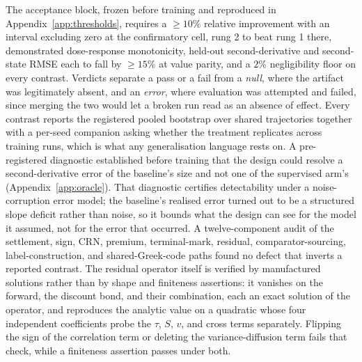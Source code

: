 \documentclass{article}
\begin{document}
The acceptance block, frozen before training and reproduced in
Appendix~\ref{app:thresholds}, requires a $\geq 10\%$ relative improvement with an
interval excluding zero at the confirmatory cell, rung 2 to beat rung 1 there,
demonstrated dose-response monotonicity, held-out second-derivative and second-state
RMSE each to fall by $\geq 15\%$ at value parity, and a $2\%$ negligibility floor on
every contrast. Verdicts separate a pass or a fail from a \emph{null}, where the artifact was
legitimately absent, and an \emph{error}, where evaluation was attempted and failed,
since merging the two would let a broken run read as an absence of effect. Every
contrast reports the registered pooled bootstrap over shared trajectories together
with a per-seed companion asking whether the treatment replicates across training
runs, which is what any generalisation language rests on. A pre-registered diagnostic established before training that the design could
resolve a second-derivative error of the baseline's size and not one of the
supervised arm's (Appendix~\ref{app:oracle}). That diagnostic certifies detectability
under a noise-corruption error model; the baseline's realised error turned out to be
a structured slope deficit rather than noise, so it bounds what the design can see
for the model it assumed, not for the error that occurred. A twelve-component audit of
the settlement, sign, CRN, premium, terminal-mark, residual, comparator-sourcing,
label-construction, and shared-Greek-code paths found no defect that inverts a
reported contrast. The residual operator itself is verified by manufactured
solutions rather than by shape and finiteness assertions: it vanishes on the
forward, the discount bond, and their combination, each an exact solution of the
operator, and reproduces the analytic value on a quadratic whose four independent
coefficients probe the $\tau$, $S$, $v$, and cross terms separately. Flipping the
sign of the correlation term or deleting the variance-diffusion term fails that
check, while a finiteness assertion passes under both.
\end{document}
